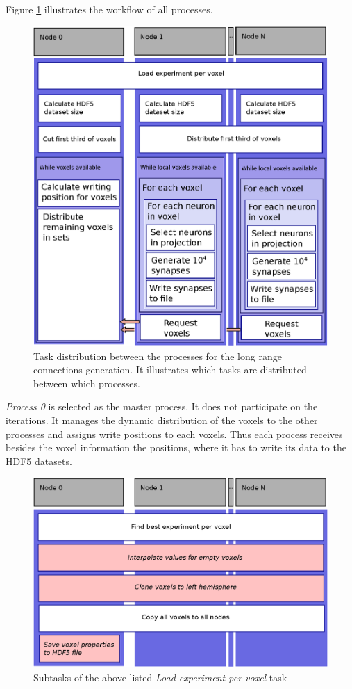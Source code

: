 Figure \ref{fig:longrangParallel} illustrates the workflow of all processes.
\begin{figure}[ht!]
\centering
\includegraphics[scale=0.5]{pictures/longRange_parallelAlg.eps}
\caption{Task distribution between the processes for the long range connections generation. It illustrates which tasks are distributed between which processes.}
\label{fig:longrangParallel}
\end{figure}
\emph{Process 0} is selected as the master process. It does not participate on the iterations.
It manages the dynamic distribution of the voxels to the other processes and 
assigns write positions to each voxels. Thus each process receives besides the 
voxel information the positions,
where it has to write its data to the HDF5 datasets.
\begin{figure}[ht!]
\centering
\includegraphics[scale=0.5]{pictures/longRange_BestExp_parallelAlg.eps}
\caption{Subtasks of the above listed \emph{Load experiment per voxel} task}
\label{fig:longrangeLEPV}
\end{figure}
